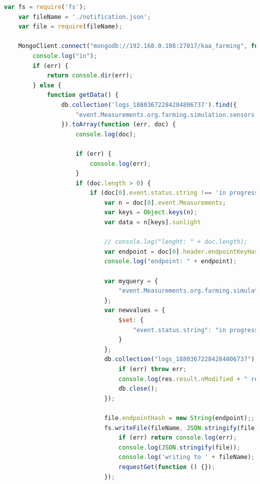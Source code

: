 \documentclass[12pt, twoside]{book}
\begin{document}
\begin{appendices}
\begin{lstlisting}[language=JavaScript]
    var fs = require('fs');
    var fileName = './notification.json';
    var file = require(fileName);

    MongoClient.connect("mongodb://192.168.0.108:27017/kaa_farming", function (err, db) {
        console.log("in");
        if (err) {
            return console.dir(err);
        } else {
            function getData() {
                db.collection('logs_18803672284284806737').find({
                    "event.Measurements.org.farming.simulation.sensors.measurements.LightingData.sunlight": 179213382
                }).toArray(function (err, doc) {
                    console.log(doc);

                    if (err) {
                        console.log(err);
                    }
                    if (doc.length > 0) {
                        if (doc[0].event.status.string !== 'in progress') {
                            var n = doc[0].event.Measurements;
                            var keys = Object.keys(n);
                            var data = n[keys].sunlight

                            // console.log("lenght: " + doc.length);
                            var endpoint = doc[0].header.endpointKeyHash.string;
                            console.log("endpoint: " + endpoint);

                            var myquery = {
                                "event.Measurements.org.farming.simulation.sensors.measurements.LightingData.sunlight": data
                            };
                            var newvalues = {
                                $set: {
                                    "event.status.string": "in progress"
                                }
                            };
                            db.collection("logs_18803672284284806737").update(myquery, newvalues, function (err, res) {
                                if (err) throw err;
                                console.log(res.result.nModified + " record updated");
                                db.close();
                            });

                            file.endpointHash = new String(endpoint);;
                            fs.writeFile(fileName, JSON.stringify(file), function (err) {
                                if (err) return console.log(err);
                                console.log(JSON.stringify(file));
                                console.log('writing to ' + fileName);
                                requestGet(function () {});
                            });
                           

\end{lstlisting}
\end{appendices}
\end{document}

